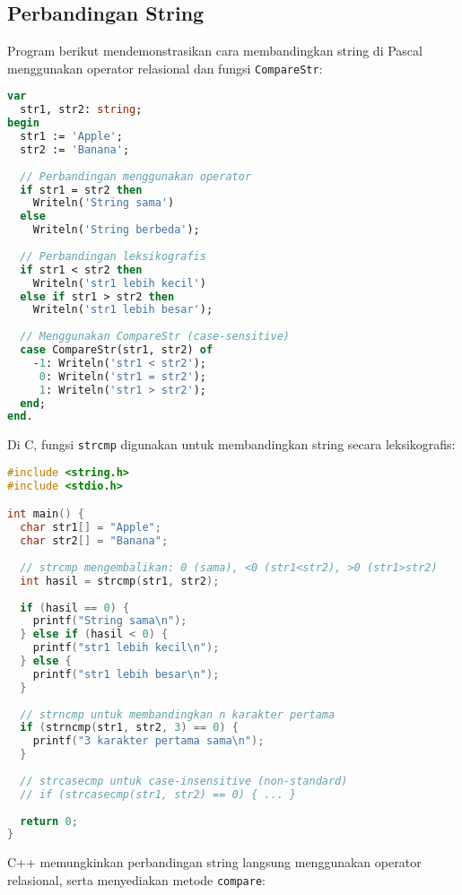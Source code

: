 \documentclass[../main.tex]{subfiles}
\begin{document}
\subsection{Perbandingan String}

Program berikut mendemonstrasikan cara membandingkan string di Pascal menggunakan operator relasional dan fungsi \texttt{CompareStr}:

\begin{lstlisting}[language=Pascal, caption={Perbandingan di Pascal}]
var
  str1, str2: string;
begin
  str1 := 'Apple';
  str2 := 'Banana';
  
  // Perbandingan menggunakan operator
  if str1 = str2 then
    Writeln('String sama')
  else
    Writeln('String berbeda');
  
  // Perbandingan leksikografis
  if str1 < str2 then
    Writeln('str1 lebih kecil')
  else if str1 > str2 then
    Writeln('str1 lebih besar');
  
  // Menggunakan CompareStr (case-sensitive)
  case CompareStr(str1, str2) of
    -1: Writeln('str1 < str2');
     0: Writeln('str1 = str2');
     1: Writeln('str1 > str2');
  end;
end.
\end{lstlisting}

Di C, fungsi \texttt{strcmp} digunakan untuk membandingkan string secara leksikografis:

\begin{lstlisting}[language=C, caption={Perbandingan di C}]
#include <string.h>
#include <stdio.h>

int main() {
  char str1[] = "Apple";
  char str2[] = "Banana";
  
  // strcmp mengembalikan: 0 (sama), <0 (str1<str2), >0 (str1>str2)
  int hasil = strcmp(str1, str2);
  
  if (hasil == 0) {
    printf("String sama\n");
  } else if (hasil < 0) {
    printf("str1 lebih kecil\n");
  } else {
    printf("str1 lebih besar\n");
  }
  
  // strncmp untuk membandingkan n karakter pertama
  if (strncmp(str1, str2, 3) == 0) {
    printf("3 karakter pertama sama\n");
  }
  
  // strcasecmp untuk case-insensitive (non-standard)
  // if (strcasecmp(str1, str2) == 0) { ... }
  
  return 0;
}
\end{lstlisting}

C++ memungkinkan perbandingan string langsung menggunakan operator relasional, serta menyediakan metode \texttt{compare}:
\end{document}
